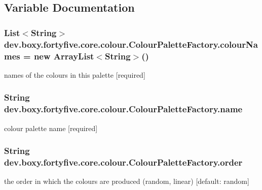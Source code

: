 \subsection{Variable Documentation}
\hypertarget{group__colour_palettes_gaf1d7c0a9d0cb9700e6eaaad2664109a7}{
\subsubsection[{colourNames}]{\setlength{\rightskip}{0pt plus 5cm}List$<$String$>$ {\bf dev.boxy.fortyfive.core.colour.ColourPaletteFactory.colourNames} = new ArrayList$<$String$>$()}}
\label{db/d3d/group__colour_palettes_gaf1d7c0a9d0cb9700e6eaaad2664109a7}
names of the colours in this palette \mbox{[}required\mbox{]} \hypertarget{group__colour_palettes_gaefe7048b51865679210bed6bac8ec293}{
\subsubsection[{name}]{\setlength{\rightskip}{0pt plus 5cm}String {\bf dev.boxy.fortyfive.core.colour.ColourPaletteFactory.name}}}
\label{db/d3d/group__colour_palettes_gaefe7048b51865679210bed6bac8ec293}
colour palette name \mbox{[}required\mbox{]} \hypertarget{group__colour_palettes_gaf45caec18a77e26b4836d04f51f7c267}{
\subsubsection[{order}]{\setlength{\rightskip}{0pt plus 5cm}String {\bf dev.boxy.fortyfive.core.colour.ColourPaletteFactory.order}}}
\label{db/d3d/group__colour_palettes_gaf45caec18a77e26b4836d04f51f7c267}
the order in which the colours are produced (random, linear) \mbox{[}default: random\mbox{]} 